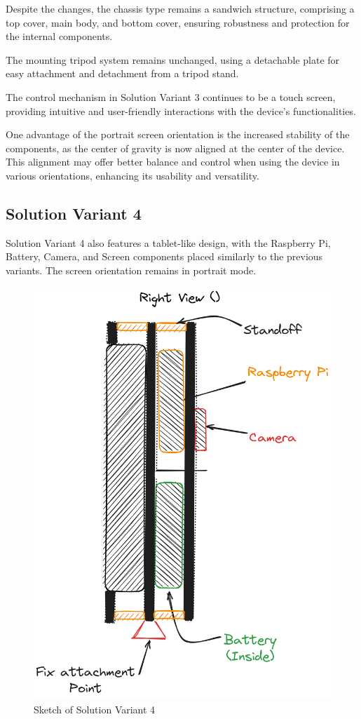 Despite the changes, the chassis type remains a sandwich structure, comprising a top cover, main body, and bottom cover, ensuring robustness and protection for the internal components.

The mounting tripod system remains unchanged, using a detachable plate for easy attachment and detachment from a tripod stand.

The control mechanism in Solution Variant 3 continues to be a touch screen, providing intuitive and user-friendly interactions with the device's functionalities.

One advantage of the portrait screen orientation is the increased stability of the components, as the center of gravity is now aligned at the center of the device. This alignment may offer better balance and control when using the device in various orientations, enhancing its usability and versatility.

\subsection{Solution Variant 4}

Solution Variant 4 also features a tablet-like design, with the Raspberry Pi, Battery, Camera, and Screen components placed similarly to the previous variants. The screen orientation remains in portrait mode.

\begin{figure}[ht!]
    \centering
    \includegraphics[scale=0.25]{texs/Part1/chapter3/image/v4.png}
    \caption{Sketch of Solution Variant 4}
    \label{fig:sketch-solution-variant-4}
\end{figure}


